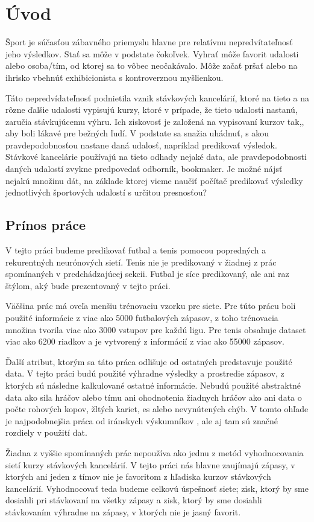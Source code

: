 \chapter*{Úvod}
Šport je súčasťou zábavného priemyslu hlavne pre relatívnu nepredvítateľnosť jeho výsledkov. 
Stať sa môže v podstate čokoľvek. 
Vyhrať môže favorit udalosti alebo osoba/tím, od ktorej sa to vôbec neočakávalo.
Môže začať pršať alebo na ihrisko vbehnúť exhibicionista s kontroverznou myšlienkou.

Táto nepredvídateľnosť podnietila vznik stávkových kancelárií, ktoré na tieto a na rôzne ďalšie udalosti vypisujú kurzy, ktoré v prípade, že tieto udalosti nastanú, zaručia stávkujúcemu výhru.
Ich ziskovosť je založená na vypisovaní kurzov tak,, aby boli lákavé pre bežných ľudí.
V podstate sa snažia uhádnuť, s akou pravdepodobnosťou nastane daná udalosť, napríklad predikovať výsledok.
Stávkové kancelárie používajú na tieto odhady nejaké data, ale pravdepodobnosti daných udalostí zvykne predpovedať odborník, bookmaker.
Je možné nájsť nejakú množinu dát, na základe ktorej vieme naučiť počítač predikovať výsledky jednotlivých športových udalostí s určitou presnosťou?


\section*{Prínos práce}
V tejto práci budeme predikovať futbal a tenis pomocou popredných a rekurentných neurónových sietí.
Tenis nie je predikovaný v žiadnej z prác spomínaných v predchádzajúcej sekcii.
Futbal je síce predikovaný, ale ani raz štýlom, aký bude prezentovaný v tejto práci.

Väčšina prác má oveľa menšiu trénovaciu vzorku pre siete. 
Pre túto prácu boli použité informácie z viac ako 5000 futbalových zápasov, z toho trénovacia množina tvorila viac ako 3000 vstupov pre každú ligu.
Pre tenis obsahuje dataset viac ako 6200 riadkov a je vytvorený z informácií z viac ako 55000 zápasov.

Ďalší atribut, ktorým sa táto práca odlišuje od ostatných predstavuje použité data. V tejto práci budú použité výhradne výsledky a prostredie zápasov, z ktorých sú následne kalkulované ostatné informácie.
Nebudú použité abstraktné data ako sila hráčov alebo tímu ani ohodnotenia žiadnych hráčov ako ani data o počte rohových kopov, žltých kariet, es alebo nevynútených chýb. 
V tomto ohľade je najpodobnejšia práca od iránskych výskumníkov \citep{related:iran}, ale aj tam sú značné rozdiely v použití dat.

Žiadna z vyššie spomínaných prác nepoužíva ako jednu z metód vyhodnocovania sietí kurzy stávkových kancelárií.
V tejto práci nás hlavne zaujímajú zápasy, v ktorých ani jeden z tímov nie je favoritom z hľadiska kurzov stávkových kancelárií.
Vyhodnocovať teda budeme celkovú úspešnosť siete; zisk, ktorý by sme dosiahli pri stávkovaní na všetky zápasy a zisk, ktorý by sme dosiahli stávkovaním výhradne na zápasy, v ktorých nie je jasný favorit.
